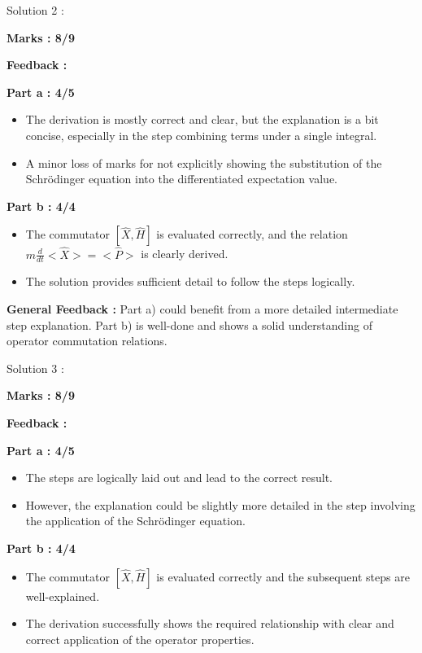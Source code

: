 \documentclass[a4paper,11pt]{article}
\begin{document}
Solution 2 :

\textbf{Marks : 8/9}

\textbf{Feedback :}

\textbf{Part a : 4/5}

\begin{itemize}
    \item The derivation is mostly correct and clear, but the explanation is a bit concise, especially in the step combining terms under a single integral.
    \item A minor loss of marks for not explicitly showing the substitution of the Schrödinger equation into the differentiated expectation value.
\end{itemize}


\textbf{Part b : 4/4}

\begin{itemize}
    \item The commutator $[\hat{X}, \hat{H}]$ is evaluated correctly, and the relation $m\frac{d}{dt} <\hat{X}> = <\hat{P}> $ is clearly derived.
    \item The solution provides sufficient detail to follow the steps logically.
\end{itemize}

\textbf{General Feedback :}
Part a) could benefit from a more detailed intermediate step explanation. Part b) is well-done and shows a solid understanding of operator commutation relations.



Solution 3 :

\textbf{Marks : 8/9}

\textbf{Feedback :}

\textbf{Part a : 4/5}

\begin{itemize}
    \item The steps are logically laid out and lead to the correct result.
    \item However, the explanation could be slightly more detailed in the step involving the application of the Schrödinger equation.
\end{itemize}


\textbf{Part b : 4/4}

\begin{itemize}
    \item The commutator $[\hat{X}, \hat{H}]$ is evaluated correctly and the subsequent steps are well-explained.
    \item The derivation successfully shows the required relationship with clear and correct application of the operator properties.
\end{itemize}
\end{document}
